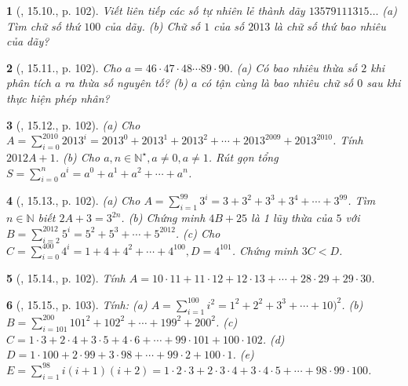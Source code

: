 \documentclass{article}
\newtheorem{baitoan}{}
\begin{document}
\begin{baitoan}[\cite{TLCT_THCS_Toan_6_so_hoc}, 15.10., p. 102]
	Viết liên tiếp các số tự nhiên lẻ thành dãy $13579111315\ldots$ (a) Tìm chữ số thứ $100$ của dãy. (b) Chữ số $1$ của số $2013$ là chữ số thứ bao nhiêu của dãy?
\end{baitoan}

\begin{baitoan}[\cite{TLCT_THCS_Toan_6_so_hoc}, 15.11., p. 102]
	Cho $a = 46\cdot47\cdot48\cdots89\cdot90$. (a) Có bao nhiêu thừa số $2$ khi phân tích $a$ ra thừa số nguyên tố? (b) $a$ có tận cùng là bao nhiêu chữ số $0$ sau khi thực hiện phép nhân?
\end{baitoan}

\begin{baitoan}[\cite{TLCT_THCS_Toan_6_so_hoc}, 15.12., p. 102]
	(a) Cho $A = \sum_{i=0}^{2010} 2013^i = 2013^0 + 2013^1 + 2013^2 + \cdots + 2013^{2009} + 2013^{2010}$. Tính $2012A + 1$. (b) Cho $a,n\in\mathbb{N}^\star,a\ne0,a\ne1$. Rút gọn tổng $S = \sum_{i=0}^n a^i = a^0 + a^1 + a^2 + \cdots + a^n$.
\end{baitoan}

\begin{baitoan}[\cite{TLCT_THCS_Toan_6_so_hoc}, 15.13., p. 102]
	(a) Cho $A = \sum_{i=1}^{99} 3^i = 3 + 3^2 + 3^3 + 3^4 + \cdots + 3^{99}$. Tìm $n\in\mathbb{N}$ biết $2A + 3 = 3^{2n}$. (b) Chứng minh $4B + 25$ là 1 lũy thừa của $5$ với $B = \sum_{i=2}^{2012} 5^i = 5^2 + 5^3 + \cdots + 5^{2012}$. (c) Cho $C = \sum_{i=0}^{400} 4^i = 1 + 4 + 4^2 + \cdots + 4^{100},D = 4^{101}$. Chứng minh $3C < D$.
\end{baitoan}

\begin{baitoan}[\cite{TLCT_THCS_Toan_6_so_hoc}, 15.14., p. 102]
	Tính $A = 10\cdot11 + 11\cdot12 + 12\cdot13 + \cdots + 28\cdot29 + 29\cdot30$.
\end{baitoan}

\begin{baitoan}[\cite{TLCT_THCS_Toan_6_so_hoc}, 15.15., p. 103]
	Tính: (a) $A = \sum_{i=1}^{100} i^2 = 1^2 + 2^2 + 3^3 + \cdots + 10)^2$. (b) $B = \sum_{i=101}^{200} 101^2 + 102^2 + \cdots + 199^2 + 200^2$. (c) $C = 1\cdot3 + 2\cdot4 + 3\cdot5 + 4\cdot6 + \cdots + 99\cdot101 + 100\cdot102$. (d) $D = 1\cdot100 + 2\cdot99 + 3\cdot98 + \cdots + 99\cdot2 + 100\cdot1$. (e) $E = \sum_{i=1}^{98} i(i + 1)(i + 2) = 1\cdot2\cdot3 + 2\cdot3\cdot4 + 3\cdot4\cdot5 + \cdots + 98\cdot99\cdot100$.
\end{baitoan}
\end{document}
